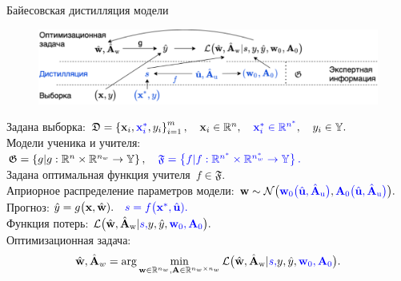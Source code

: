 \documentclass[10pt,pdf,hyperref={unicode}]{beamer}
\begin{document}
\begin{frame}{Байесовская дистилляция модели}
\justifying
\begin{figure}[h!]
\includegraphics[width=1.0\textwidth]{slides/figures/introdigram_large}
\end{figure}

Задана выборка:
$
	\mathfrak{D} = \left\{\textbf{x}_i, {\color{blue}\textbf{x}_i^{*}}, y_i\right\}_{i=1}^{m}, 
	\quad \textbf{x}_{i} \in \mathbb{R}^{n}, 
	{\color{blue}\quad \textbf{x}_{i}^{*} \in \mathbb{R}^{n^{*}}},
	\quad y_i \in \mathbb{Y}.
$\\[1mm]
Модели ученика и учителя:
$
    \mathfrak{G} = \left\{g | g : \mathbb{R}^{n}\times \mathbb{R}^{n_{w}} \to \mathbb{Y} \right\},
{\color{blue}
    \quad \mathfrak{F} = \left\{f | f : \mathbb{R}^{n^{*}}\times \mathbb{R}^{n_{w}^{*}} \to \mathbb{Y} \right\}.
}
$\\[1mm]
{\color{blue}
Задана оптимальная функция учителя~$f \in \mathfrak{F}.$
}
\\[1mm]
Априорное распределение параметров модели:
$
    \textbf{w} \sim \mathcal{N}\bigr({\color{blue}\textbf{w}_0\bigr(\hat{\textbf{u}}, \hat{\textbf{A}}_{\text{u}}\bigr)}, {\color{blue}\textbf{A}_0\bigr(\hat{\textbf{u}}, \hat{\textbf{A}}_{\text{u}}\bigr)}\bigr).
$\\[1mm]
Прогноз:
$
    \hat{y} = g\bigr(\textbf{x}, \hat{\textbf{w}}).
{\color{blue}
    \quad
    s = f\bigr(\textbf{x}^{*}, \hat{\textbf{u}}).
}
$\\[1mm]
Функция потерь:
$
    \mathcal{L}\bigr(\hat{\textbf{w}},\hat{\textbf{A}}_{\text{w}}|{\color{blue} s, }y, \hat{y}, {\color{blue}\textbf{w}_0, \textbf{A}_0}\bigr).
$\\[1mm]
Оптимизационная задача:
\[
    \hat{\textbf{w}}, \hat{\textbf{A}}_{w} = \arg \min_{\textbf{w} \in \mathbb{R}^{n_{w}}, \textbf{A} \in \mathbb{R}^{n_{w}\times n_{w}}} \mathcal{L}\bigr(\hat{\textbf{w}},\hat{\textbf{A}}_{\text{w}}|{\color{blue} s, }y, \hat{y}, {\color{blue}\textbf{w}_0, \textbf{A}_0}\bigr).
\]
\end{frame}
\end{document}
